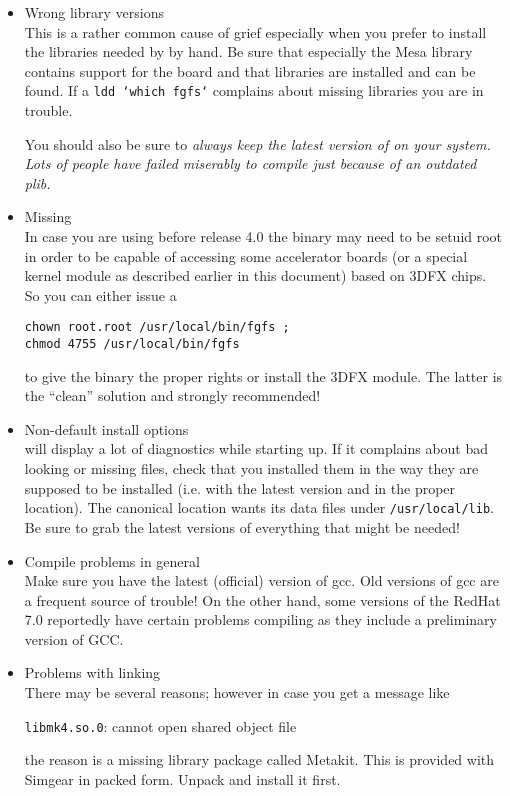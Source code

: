 \begin{itemize}

\item{Wrong library versions}\\
  This is a rather common cause of grief especially when you prefer to
  install the libraries needed by \FlightGear{} by hand. Be sure that
  especially the Mesa library contains support for the
   board and that  libraries are installed and can be
  found. If a \texttt{ldd `which fgfs`} complains about missing
  libraries you are in trouble.

  You should also be sure to \em{always} keep the \em{latest} version
  of \PLIB{} on your system. Lots of people have
  failed miserably to compile \FlightGear{} just because of an outdated
  plib.


\item{Missing }\\
 In case you are using  before release 4.0 the \FlightGear{} binary may need to be  setuid root in order to be capable of  accessing some accelerator boards (or a special kernel module as described earlier in this document) based on 3DFX chips.
  So you can either issue a

  \texttt{chown root.root /usr/local/bin/fgfs ;}\\
  \texttt{chmod 4755 /usr/local/bin/fgfs}

  to give the \FlightGear{} binary the proper rights or install
  the 3DFX module. The latter is the ``clean''
  solution and strongly recommended!


\item{Non-default install options}\\
  \FlightGear{} will display a lot of diagnostics while starting up.
  If it complains about bad looking or missing files, check that you
  installed them in the way they are supposed to be installed (i.e. with the latest
  version and in the proper location). The canonical location \FlightGear{}
  wants its data files under \texttt{/usr/local/lib}.
   Be sure to grab the latest versions of everything that might be needed!

\item{Compile problems in general}\\
  Make sure you have the latest (official) version of gcc. Old versions of
  gcc are a frequent source of trouble! On the other hand, some versions
  of the RedHat 7.0 reportedly have certain problems compiling \FlightGear{} as they include
  a preliminary version of GCC.

\item{Problems with linking}\\
There may be several reasons; however in case you get a message like

\texttt{libmk4.so.0}: cannot open shared object file

the reason is a missing library package called Metakit. This is provided with Simgear in packed form. Unpack and install it first.
 \end{itemize}

